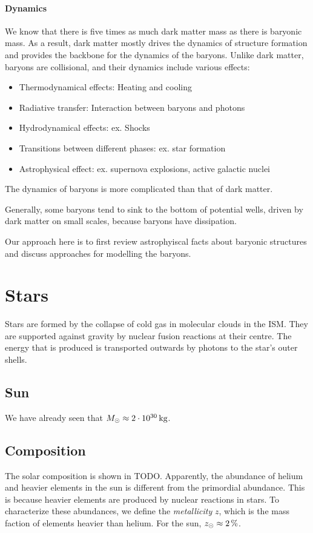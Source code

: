 \paragraph{Dynamics}
We know that there is five times as much dark matter mass as there is baryonic mass.
As a result, dark matter mostly drives the dynamics of structure formation and provides the backbone for the dynamics of the baryons.
Unlike dark matter, baryons are collisional, and their dynamics include various effects:
\begin{itemize}
	\item Thermodynamical effects: Heating and cooling
	\item Radiative transfer: Interaction between baryons and photons
	\item Hydrodynamical effects: ex. Shocks
	\item Transitions between different phases: ex. star formation
	\item Astrophysical effect: ex. supernova explosions, active galactic nuclei
\end{itemize}
The dynamics of baryons is more complicated than that of dark matter.


Generally, some baryons tend to sink to the bottom of potential wells, driven by dark matter on small scales, because baryons have dissipation.

Our approach here is to first review astrophyiscal facts about baryonic structures and discuss approaches for modelling the baryons.





\section{Stars}

Stars are formed by the collapse of cold gas in molecular clouds in the ISM.
They are supported against gravity by nuclear fusion reactions at their centre.
The energy that is produced is transported outwards by photons to the star's outer shells.

\subsection{Sun}
We have already seen that $M_\sol \approx \SI{2e30}{\kg}$.

\subsection{Composition}
The solar composition is shown in TODO.
Apparently, the abundance of helium and heavier elements in the sun is different from the primordial abundance.
This is because heavier elements are produced by nuclear reactions in stars.
To characterize these abundances, we define the \emph{metallicity} $z$, which is the mass faction of elements heavier than helium.
For the sun, $z_\odot \approx \SI{2}{\percent}$.


